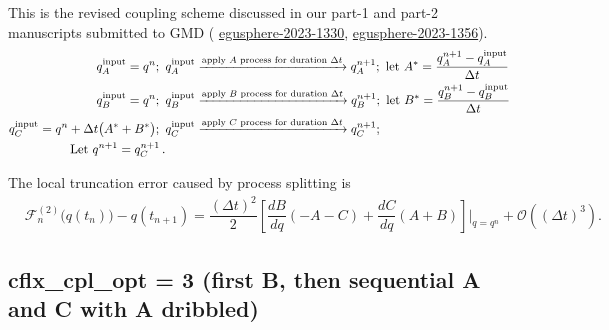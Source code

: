 \documentclass[12pt]{article}
\begin{document}
This is the revised coupling scheme discussed in our part-1 and part-2 manuscripts
submitted to GMD (
\href{https://egusphere.copernicus.org/preprints/2023/egusphere-2023-1330/}{egusphere-2023-1330},
\href{https://egusphere.copernicus.org/preprints/2023/egusphere-2023-1356/}{egusphere-2023-1356}).
%
\begin{align*}
q^{\rm input}_{A} = q^n;\,\,\,
&q^{\rm input}_{A} \xrightarrow{\text{apply $A$ process for duration $\Delta t$}} q^{n+1}_{A};\,\,
\text{let}\,\, {A}^* = \dfrac{q^{n+1}_{A} - q^{\rm input}_{A}}{\Delta t} \\
%
q^{\rm input}_{B} = q^n;\,\,\, 
& q^{\rm input}_{B} \xrightarrow{\text{apply $B$ process for duration $\Delta t$}} q^{n+1}_{B};\,\, 
\text{let}\,\, {B}^* = \dfrac{q^{n+1}_{B} - q^{\rm input}_{B}}{\Delta t} \\
%
q^{\rm input}_{C} = q^n + \Delta t\big({A}^* + {B}^*\big);\,\,\, 
& q^{\rm input}_{C}\xrightarrow{\text{apply $C$ process for duration $\Delta t$}} q^{n+1}_{C};\,\, 
 \\
%
\text{Let}\,\, q^{n+1} = q^{n+1}_{C} \,.
\end{align*}

The local truncation error caused by process splitting is
\begin{align}
&\mathcal{F}_n^{(2)}\Big(q(t_n)\Big) - q(t_{n+1}) 
= \dfrac{(\Delta t)^2}{2}\left[  \dfrac{dB}{dq}(-A-C) + \dfrac{dC}{dq}(A+B)\right]\bigg|_{q=q^n}
+\mathcal{O}\left( (\Delta t)^3\right).
\end{align}


\subsection{{\sf cflx\_cpl\_opt = 3} (first B, then sequential A and C with A dribbled)}
\end{document}
